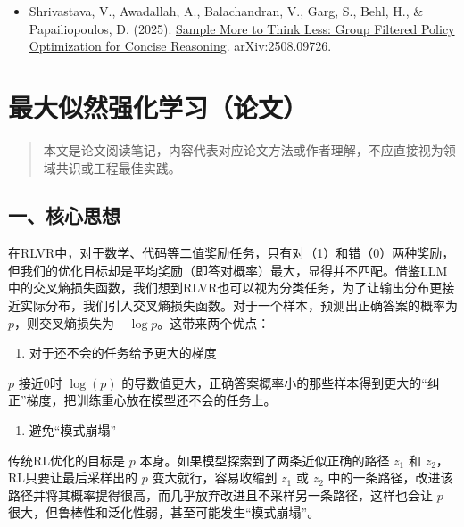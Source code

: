 \begin{itemize}
\tightlist
\item
  Shrivastava, V., Awadallah, A., Balachandran, V., Garg, S., Behl, H., \& Papailiopoulos, D. (2025). \href{https://arxiv.org/abs/2508.09726}{Sample More to Think Less: Group Filtered Policy Optimization for Concise Reasoning}. arXiv:2508.09726.
\end{itemize}

\clearpage

\hypertarget{ux6700ux5927ux4f3cux7136ux5f3aux5316ux5b66ux4e60ux8bbaux6587}{%
\section{最大似然强化学习（论文）}\label{ux6700ux5927ux4f3cux7136ux5f3aux5316ux5b66ux4e60ux8bbaux6587}}

\begin{quote}
本文是论文阅读笔记，内容代表对应论文方法或作者理解，不应直接视为领域共识或工程最佳实践。
\end{quote}

\hypertarget{ux4e00ux6838ux5fc3ux601dux60f3-9}{%
\subsection{一、核心思想}\label{ux4e00ux6838ux5fc3ux601dux60f3-9}}

在RLVR中，对于数学、代码等二值奖励任务，只有对（1）和错（0）两种奖励，但我们的优化目标却是平均奖励（即答对概率）最大，显得并不匹配。借鉴LLM中的交叉熵损失函数，我们想到RLVR也可以视为分类任务，为了让输出分布更接近实际分布，我们引入交叉熵损失函数。对于一个样本，预测出正确答案的概率为 \(p\)，则交叉熵损失为 \(-\log p\)。这带来两个优点：

\begin{enumerate}
\def\labelenumi{\arabic{enumi}.}
\tightlist
\item
  对于还不会的任务给予更大的梯度
\end{enumerate}

\(p\) 接近0时 \(\log(p)\) 的导数值更大，正确答案概率小的那些样本得到更大的``纠正''梯度，把训练重心放在模型还不会的任务上。

\begin{enumerate}
\def\labelenumi{\arabic{enumi}.}
\setcounter{enumi}{1}
\tightlist
\item
  避免``模式崩塌''
\end{enumerate}

传统RL优化的目标是 \(p\) 本身。如果模型探索到了两条近似正确的路径 \(z_1\) 和 \(z_2\)，RL只要让最后采样出的 \(p\) 变大就行，容易收缩到 \(z_1\) 或 \(z_2\) 中的一条路径，改进该路径并将其概率提得很高，而几乎放弃改进且不采样另一条路径，这样也会让 \(p\) 很大，但鲁棒性和泛化性弱，甚至可能发生``模式崩塌''。

